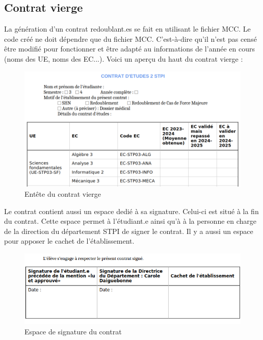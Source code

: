 \subsection{Contrat vierge }
La génération d'un contrat redoublant.es se fait en utilisant le fichier MCC. Le code créé ne doit dépendre que du fichier MCC. 
C'est-à-dire qu'il n'est pas censé être modifié pour fonctionner et être adapté au informations de l'année en cours (noms des UE, noms des EC...). 
Voici un aperçu du haut du contrat vierge :

\begin{figure}[ht]
    \includegraphics[width=\linewidth]{images/contrat_vierge.jpg}
    \caption{Entête du contrat vierge}
    \label{contrat_vierge}
\end{figure}

Le contrat contient aussi un espace dedié à sa signature. Celui-ci est situé à la fin du contrat.
Cette espace permet à l'étudiant.e ainsi qu'à à la personne en charge de la direction du département STPI de signer le contrat.
Il y a aussi un espace pour apposer le cachet de l'établissement.

\begin{figure}[ht]
\includegraphics[width=\linewidth]{images/signature.jpg}
\caption{Espace de signature du contrat}
\label{signature}
\end{figure}


